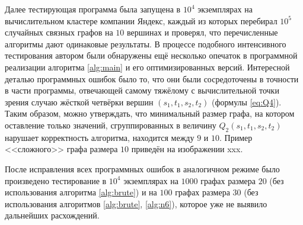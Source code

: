 Далее тестирующая программа была запущена в $10^4$ экземплярах на вычислительном кластере компании Яндекс, каждый из которых перебирал $10^5$ случайных связных графов на $10$ вершинах и проверял, что перечисленные алгоритмы дают одинаковые результаты. В процессе подобного интенсивного тестирования автором были обнаружены ещё несколько опечаток в программной реализации алгоритма \ref{alg:main} и его оптимизированных версий. Интересной деталью программных ошибок было то, что они были сосредоточены в точности в части программы, отвечающей самому тяжёлому с вычислительной точки зрения случаю жёсткой четвёрки вершин $(s_1, t_1, s_2, t_2)$ (формулы \eqref{eq:Q4}). Таким образом, можно утверждать, что минимальный размер графа, на котором оставление только значений, сгруппированных в величину $Q_2(s_1, t_1, s_2, t_2)$ нарушает корректность алгоритма, находится между $9$ и $10$. Пример <<сложного>> графа размера $10$ приведён на изображении xxx. 

После исправления всех программных ошибок в аналогичном режиме было произведено тестирование в $10^4$ экземплярах на $1000$ графах размера $20$ (без использования алгоритма \ref{alg:brute}) и на $100$ графах размера $30$ (без использования алгоритмов \ref{alg:brute}, \ref{alg:n6}), которое уже не выявило дальнейших расхождений.


